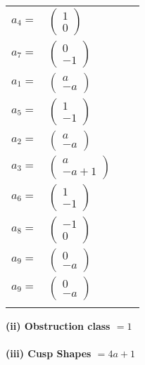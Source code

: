 \documentclass[1p]{elsarticle_modified}
\theoremstyle{definition}
\begin{document}
\begin{tabular}{m{7pt} m{180pt} m{7pt} m{180pt} }
\flushright $a_{4}=$&$\begin{pmatrix}1\\0\end{pmatrix}$ \\
\flushright $a_{7}=$&$\begin{pmatrix}0\\-1\end{pmatrix}$ \\
\flushright $a_{1}=$&$\begin{pmatrix}a\\- a\end{pmatrix}$ \\
\flushright $a_{5}=$&$\begin{pmatrix}1\\-1\end{pmatrix}$ \\
\flushright $a_{2}=$&$\begin{pmatrix}a\\- a\end{pmatrix}$ \\
\flushright $a_{3}=$&$\begin{pmatrix}a\\- a+1\end{pmatrix}$ \\
\flushright $a_{6}=$&$\begin{pmatrix}1\\-1\end{pmatrix}$ \\
\flushright $a_{8}=$&$\begin{pmatrix}-1\\0\end{pmatrix}$ \\
\flushright $a_{9}=$&$\begin{pmatrix}0\\- a\end{pmatrix}$\\ \flushright $a_{9}=$&$\begin{pmatrix}0\\- a\end{pmatrix}$\\&\end{tabular}
\flushleft \textbf{(ii) Obstruction class $= 1$}\\~\\
\flushleft \textbf{(iii) Cusp Shapes $= 4 a+1$}\\~\\
\end{document}
